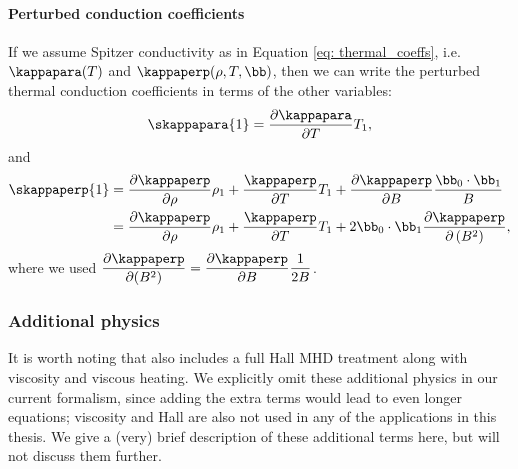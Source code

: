 \paragraph{Perturbed conduction coefficients} If we assume Spitzer conductivity as in Equation \eqref{eq: thermal_coeffs}, i.e. $\kappapara(T)$ and $\kappaperp(\rho, T, \bb)$, then we can write the perturbed thermal conduction coefficients in terms of the other variables:
\begin{equation}
  \skappapara{1} = \frac{\partial \kappapara}{\partial T} T_1,
\end{equation}
and
\begin{equation}
  \begin{aligned}
    \skappaperp{1} &=
      \frac{\partial \kappaperp}{\partial \rho}\rho_1
      + \frac{\kappaperp}{\partial T}T_1
      + \frac{\partial \kappaperp}{\partial B}\frac{\bb_0 \cdot \bb_1}{B} \\
    &= \frac{\partial \kappaperp}{\partial \rho}\rho_1
      + \frac{\kappaperp}{\partial T}T_1
      + 2\bb_0\cdot\bb_1 \frac{\partial \kappaperp}{\partial\left(B^2\right)},
  \end{aligned}
\end{equation}
where we used $\dfrac{\partial \kappaperp}{\partial (B^2)} = \dfrac{\partial \kappaperp}{\partial B}\dfrac{1}{2B}$.

\subsubsection{Additional physics}
It is worth noting that {\legolas} also includes a full Hall MHD treatment along with viscosity and viscous heating. We explicitly omit these additional physics in our current formalism, since adding the extra terms would lead to even longer equations; viscosity and Hall are also not used in any of the applications in this thesis. We give a (very) brief description of these additional terms here, but will not discuss them further.

